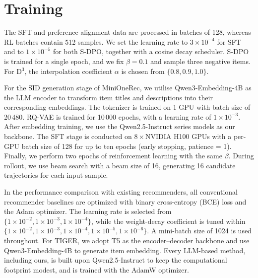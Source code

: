 \section{Training}
\label{training_detail}

The SFT and preference-alignment data are processed in batches of 128, whereas RL batches contain 512 samples.  
We set the learning rate to $3\!\times\!10^{-4}$ for SFT and to $1\!\times\!10^{-5}$ for both S-DPO, together with a cosine decay scheduler. S-DPO is trained for a single epoch, and we fix $\beta=0.1$ and sample three negative items. For D$^{3}$, the interpolation coefficient $\alpha$ is chosen from $\{0.8, 0.9, 1.0\}$.  

For the SID generation stage of MiniOneRec, we utilise Qwen3-Embedding-4B as the LLM encoder to transform item titles and descriptions into their corresponding embeddings. The tokenizer is trained on 1 GPU with batch size of 20\,480. RQ-VAE is trained for 10\,000 epochs, with a learning rate of $1\!\times\!10^{-3}$. After embedding training, we use the Qwen2.5-Instruct series models as our backbone. The SFT stage is conducted on $8\times{}$NVIDIA H100 GPUs with a per-GPU batch size of 128 for up to ten epochs (early stopping, patience = 1). Finally, we perform two epochs of reinforcement learning with the same $\beta$. During rollout, we use beam search with a beam size of 16, generating 16 candidate trajectories for each input sample.

In the performance comparison with existing recommenders, all conventional recommender baselines are optimized with binary cross-entropy (BCE) loss and the Adam optimizer.  
The learning rate is selected from $\{1\!\times\!10^{-2}, 1\!\times\!10^{-3}, 1\!\times\!10^{-4}\}$, while the weight-decay coefficient is tuned within $\{1\!\times\!10^{-2}, 1\!\times\!10^{-3}, 1\!\times\!10^{-4}, 1\!\times\!10^{-5}, 1\!\times\!10^{-6}\}$.  
A mini-batch size of 1024 is used throughout.  
For TIGER, we adopt T5 \citep{T5} as the encoder–decoder backbone and use Qwen3-Embedding-4B to generate item embedding.  
Every LLM-based method, including ours, is built upon Qwen2.5-Instruct\citep{qwen2.5} to keep the computational footprint modest, and is trained with the AdamW optimizer.  

